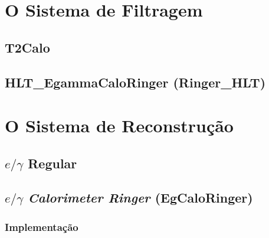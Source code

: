 

\section{O Sistema de Filtragem}
\label{sec:sf}


\subsection{T2Calo}
\label{ssec:t2calo}



\subsection{HLT\_EgammaCaloRinger (Ringer\_HLT)}
\label{ssec:hlt_ringer}




\section{O Sistema de Reconstrução}
\label{sec:sr}


\subsection{\texorpdfstring{$e/\gamma$ Regular}{Egamma Regular}}
\label{ssec:egamma}




\subsection{\texorpdfstring{$e/\gamma$ \emph{Calorimeter Ringer}
(EgCaloRinger)}{Egamma Calorimeter Ringer (EgCaloRinger)}}
\label{ssec:egringer}


\subsubsection{Implementação}
\label{sssec:egringer_impl}



